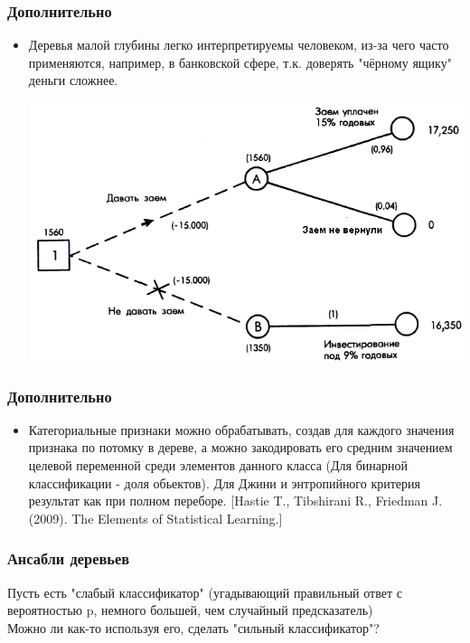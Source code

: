 \documentclass[14pt]{beamer}
\begin{document}
\begin{frame}
\frametitle{Дополнительно}
	  \begin {itemize}
		\item Деревья малой глубины легко интерпретируемы человеком, из-за чего часто применяются, например, в банковской сфере, т.к. доверять "чёрному ящику" деньги сложнее.
		\begin{center}
		    \includegraphics[height=0.4\textheight]{tree_bank.png}
		\end{center}
	  \end {itemize}
\end{frame}


\begin{frame}
\frametitle{Дополнительно}
	  \begin {itemize}
		\item Категориальные признаки можно обрабатывать, создав для каждого значения признака по потомку в дереве, а можно закодировать его средним значением целевой переменной среди элементов данного класса (Для бинарной классификации - доля обьектов). Для Джини и энтропийного критерия результат как при полном переборе. [Hastie T., Tibshirani R., Friedman J. (2009). The Elements of Statistical Learning.]
	  \end {itemize}
\end{frame}

\begin{frame}
\frametitle{Ансабли деревьев}

		Пусть есть "слабый классификатор" (угадывающий правильный ответ с вероятностью p, немного большей, чем случайный предсказатель) \\
		
		Можно ли как-то используя его, сделать "сильный классификатор"?

\end{frame}
\end{document}
